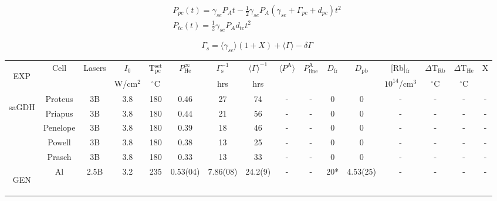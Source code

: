 \documentclass[pdftex,letterpaper,12pt]{report}
\begin{document}
	
\begin{subequations}\label{InitialSpinup}
	\begin{gather}
	P_{pc}(t)=\gamma_{se}P_{A}t-\frac{1}{2}\gamma_{se}P_{A}(\gamma_{se}+\Gamma_{pc}+d_{pc})t^{2}\\
	P_{tc}(t)=\frac{1}{2}\gamma_{se}P_{A}d_{tc}t^{2}
	\end{gather}
\end{subequations}

\begin{equation}
\Gamma_{s}=\langle \gamma_{se}\rangle(1+X)+\langle\Gamma\rangle-\delta\Gamma
\end{equation}

\begin{table}\scriptsize
	\begin{center}
		\begin{tabular}{|c|c|ccc|ccc|ccccc|cc|c|}
			\hline
			\multirow{2}{*}{\begin{sideways}{EXP}\end{sideways}}&\multirow{2}{*}{Cell} & \multirow{2}{*}{Lasers} & $I_0$ & T$_\mathrm{pc}^\mathrm{set}$ & \multirow{2}{*}{$P_\mathrm{He}^\infty$} & $\Gamma_\mathrm{s}^{-1}$ & $\langle\Gamma\rangle^{-1}$ & \multirow{2}{*}{$\langle P^\mathrm{A} \rangle$} & \multirow{2}{*}{$P_\mathrm{line}^\mathrm{A}$} & \multirow{2}{*}{$D_\mathrm{fr}$} & \multirow{2}{*}{$D_\mathrm{pb}$} & [Rb]$_\mathrm{fr}$ & $\Delta$T$_\mathrm{Rb}$ & $\Delta$T$_\mathrm{He}$ & \multirow{2}{*}{X}\\
			&& & W/cm$^2$ & $^\circ$C & & hrs & hrs & & & & & $10^{14}$/cm$^3$ & $^\circ$C & $^\circ$C &\\
			\hline
			\hline
			\multirow{5}{*}{\begin{sideways}saGDH\end{sideways}} & Proteus & 3B & 3.8 & 180 & 0.46 & 27 & 74 & - & - & 0 & 0 & - & - & - & -\\
			\cline{2-16}
			& Priapus & 3B & 3.8 & 180 & 0.44 & 21 & 56 & - & - & 0 & 0 & - & - & - & -\\
			\cline{2-16}
			& Penelope & 3B & 3.8 & 180 & 0.39 & 18 & 46 & - & - & 0 & 0 & - & - & - & -\\
			\cline{2-16}
			& Powell & 3B & 3.8 & 180 & 0.38 & 13 & 25 & - & - & 0 & 0 & - & - & - & -\\
			\cline{2-16}
			& Prasch & 3B & 3.8 & 180 & 0.33 & 13 & 33 & - & - & 0 & 0 & - & - & - & -\\
			\hline
			\hline
			\multirow{20}{*}{\begin{sideways}GEN\end{sideways}} & \multirow{2}{*}{Al} & 2.5B & 3.2 & 235 & 0.53(04) & 7.86(08) & 24.2(9) & - & - & 20* & 4.53(25) & - & - & - & - \\

\end{tabular}
\end{center}
\end{table}
\end{document}
